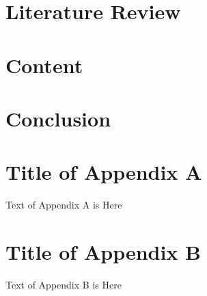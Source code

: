 \documentclass[12pt]{report}
\begin{document}
\chapter{Literature Review} \label{chp:lit}

\chapter{Content} \label{chp:work}

\chapter{Conclusion} \label{chp:conc}



\newpage






\newpage
\appendix
\chapter{Title of Appendix A} \label{App:AppendixA}

Text of Appendix A is Here

\newpage
\chapter{Title of Appendix B} \label{App:AppendixB}

Text of Appendix B is Here
\end{document}
